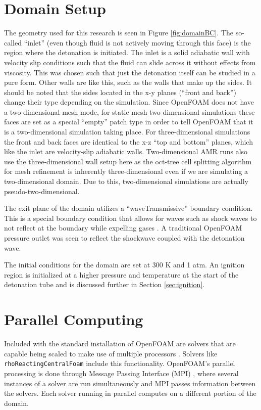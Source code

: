 \section{Domain Setup}
The geometry used for this research is seen in Figure \ref{fig:domainBC}. The so-called ``inlet'' (even though fluid is not actively moving through this face) is the region where the detonation is initiated. The inlet is a solid adiabatic wall with velocity slip conditions such that the fluid can slide across it without effects from viscosity. This was chosen such that just the detonation itself can be studied in a pure form. Other walls are like this, such as the walls that make up the sides. It should be noted that the sides located in the x-y planes (``front and back'') change their type depending on the simulation. Since OpenFOAM does not have a two-dimensional mesh mode, for static mesh two-dimensional simulations these faces are set as a special ``empty'' patch type in order to tell OpenFOAM that it is a two-dimensional simulation taking place. For three-dimensional simulations the front and back faces are identical to the x-z ``top and bottom'' planes, which like the inlet are velocity-slip adiabatic walls. Two-dimensional AMR runs also use the three-dimensional wall setup here as the oct-tree cell splitting algorithm for mesh refinement is inherently three-dimensional even if we are simulating a two-dimensional domain. Due to this, two-dimensional simulations are actually pseudo-two-dimensional. 

The exit plane of the domain utilizes a ``waveTransmissive'' boundary condition. This is a special boundary condition that allows for waves such as shock waves to not reflect at the boundary while expelling gases \cite{poinsot}. A traditional OpenFOAM pressure outlet was seen to reflect the shockwave coupled with the detonation wave. 

The initial conditions for the domain are set at 300 K and 1 atm. An ignition region is initialized at a higher pressure and temperature at the start of the detonation tube and is discussed further in Section \ref{sec:ignition}.




\section{Parallel Computing}
Included with the standard installation of OpenFOAM are solvers that are capable being scaled to make use of multiple processors \cite{ofug}. Solvers like \verb|rhoReactingCentralFoam| include this functionality. OpenFOAM's parallel processing is done through Message Passing Interface (MPI) \cite{walker}, where several instances of a solver are run simultaneously and MPI passes information between the solvers. Each solver running in parallel computes on a different portion of the domain. 

